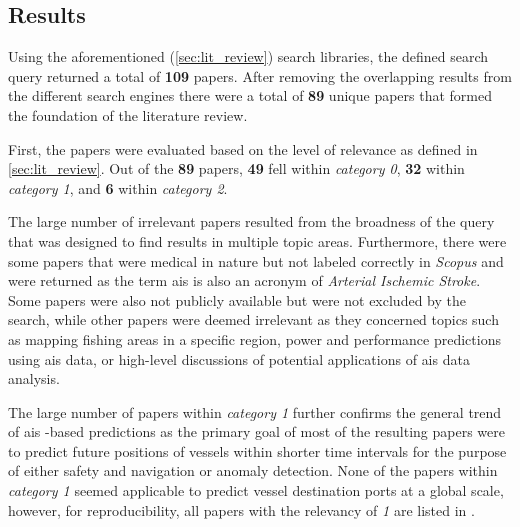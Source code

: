 \subsection{Results}

Using the aforementioned (\cref{sec:lit_review}) search libraries, the defined search query returned a total of \textbf{109} papers. After removing the overlapping results from the different search engines there were a total of \textbf{89} unique papers that formed the foundation of the literature review.

First, the papers were evaluated based on the level of relevance as defined in \cref{sec:lit_review}. Out of the \textbf{89} papers, \textbf{49} fell within \textit{category 0}, \textbf{32} within \textit{category 1}, and \textbf{6} within \textit{category 2}.

The large number of irrelevant papers resulted from the broadness of the query that was designed to find results in multiple topic areas. Furthermore, there were some papers that were medical in nature but not labeled correctly in \textit{Scopus} and were returned as the term \acrshort{ais} is also an acronym of \textit{Arterial Ischemic Stroke}. Some papers were also not publicly available but were not excluded by the search, while other papers were deemed irrelevant as they concerned topics such as mapping fishing areas in a specific region, power and performance predictions using \acrshort{ais} data, or high-level discussions of potential applications of \acrshort{ais} data analysis.

The large number of papers within \textit{category 1} further confirms the general trend of \acrshort{ais} -based predictions as the primary goal of most of the resulting papers were to predict future positions of vessels within shorter time intervals for the purpose of either safety and navigation or anomaly detection. None of the papers within \textit{category 1} seemed applicable to predict vessel destination ports at a global scale, however, for reproducibility, all papers with the relevancy of \textit{1} are listed in .

